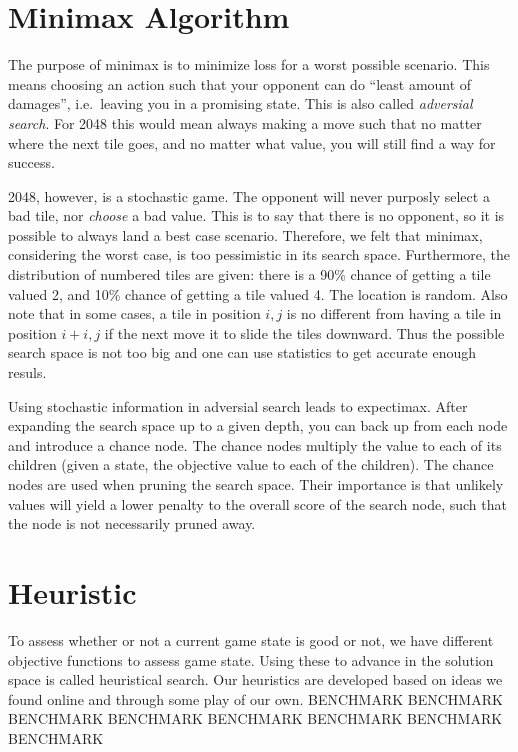 \documentclass[journal]{IEEEtran}
\begin{document}
\section*{Minimax Algorithm}
The purpose of minimax is to minimize loss for a worst possible scenario.
This means choosing an action such that your opponent can do ``least amount of damages'',
i.e.\ leaving you in a promising state. This is also called \textit{adversial search}.
For 2048 this would mean always making a move such that no matter where the next
tile goes, and no matter what value, you will still find a way for success.


2048, however, is a stochastic game. The opponent will never purposly select a
bad tile, nor \textit{choose} a bad value. This is to say that there is no opponent,
so it is possible to always land a best case scenario. Therefore, we felt that minimax,
considering the worst case, is too pessimistic in its search space.
Furthermore, the distribution of numbered tiles are given:
there is a 90\% chance of getting a tile valued 2, and 10\% chance of getting a tile
valued 4. The location is random. Also note that in some cases, a tile
in position $i,j$  is no different from having a tile in position $i+i,j$ if the
next move it to slide the tiles downward. Thus the possible search space
is not too big and one can use statistics to get accurate enough resuls.


Using stochastic information in adversial search leads to expectimax. 
After expanding the search space up to a given depth, you can back up from each
node and introduce a chance node. The chance nodes multiply the value to each
of its children (given a state, the objective value to each of the children).
The chance nodes are used when pruning the search space. Their importance is that
unlikely values will yield a lower penalty to the overall score of the search node,
such that the node is not necessarily pruned away.

\section*{Heuristic}
To assess whether or not a current game state is good or not, we have different
objective functions to assess game state. Using these to advance in the
solution space is called heuristical search. Our heuristics are developed based
on ideas we found online and through some play of our own.
BENCHMARK
BENCHMARK
BENCHMARK
BENCHMARK
BENCHMARK
BENCHMARK
BENCHMARK
BENCHMARK
\end{document}
